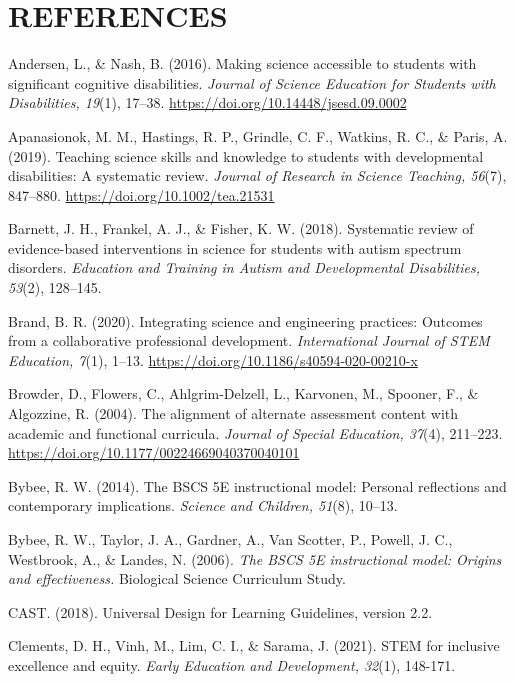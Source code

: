 \documentclass[11.5pt]{sig-alternate} %
\begin{document}
\section*{REFERENCES}\par 

\leftskip 0.25in
\parindent -0.25in %

Andersen, L., \& Nash, B. (2016). Making science accessible to students with significant cognitive disabilities. \textit{Journal of Science Education for Students with Disabilities, 19}(1), 17–38. \url{https://doi.org/10.14448/jsesd.09.0002}

Apanasionok, M. M., Hastings, R. P., Grindle, C. F., Watkins, R. C., \& Paris, A. (2019). Teaching science skills and knowledge to students with developmental disabilities: A systematic review. \textit{Journal of Research in Science Teaching, 56}(7), 847–880. \url{https://doi.org/10.1002/tea.21531}

Barnett, J. H., Frankel, A. J., \& Fisher, K. W. (2018). Systematic review of evidence-based interventions in science for students with autism spectrum disorders. \textit{Education and Training in Autism and Developmental Disabilities, 53}(2), 128–145.

Brand, B. R. (2020). Integrating science and engineering practices: Outcomes from a collaborative professional development. \textit{International Journal of STEM Education, 7}(1), 1–13. \url{https://doi.org/10.1186/s40594-020-00210-x}

Browder, D., Flowers, C., Ahlgrim-Delzell, L., Karvonen, M., Spooner, F., \& Algozzine, R. (2004). The alignment of alternate assessment content with academic and functional curricula. \textit{Journal of Special Education, 37}(4), 211–223. \url{https://doi.org/10.1177/00224669040370040101}

Bybee, R. W. (2014). The BSCS 5E instructional model: Personal reflections and contemporary implications. \textit{Science and Children, 51}(8), 10–13.

Bybee, R. W., Taylor, J. A., Gardner, A., Van Scotter, P., Powell, J. C., Westbrook, A., \& Landes, N. (2006). \textit{The BSCS 5E instructional model: Origins and effectiveness.} Biological Science Curriculum Study.

CAST. (2018). Universal Design for Learning Guidelines, version 2.2.

Clements, D. H., Vinh, M., Lim, C. I., \& Sarama, J. (2021). STEM for inclusive excellence and equity. \textit{Early Education and Development, 32}(1), 148-171. 
\end{document}
